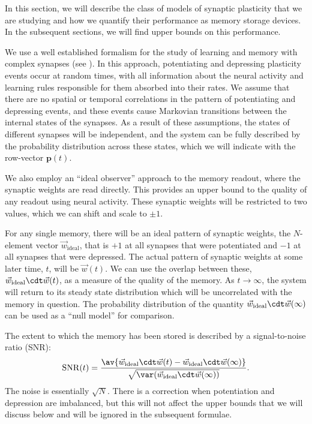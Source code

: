 \documentclass{article} %
\DeclareMathOperator{\snr}{SNR}
\newcommand{\wv}{\vec{w}}
\newcommand{\wvi}{\vec{w}_\text{ideal}}
\newcommand{\pr}{\mathbf{p}}
\begin{document}
In this section, we will describe the class of models of synaptic plasticity that we are studying and how we quantify their performance as memory storage devices.
In the subsequent sections, we will find upper bounds on this performance.

We use a well established formalism for the study of learning and memory with complex synapses (see \cite{Fusi2005cascade,Fusi2007multistate,Barrett2008discrete}).
In this approach, potentiating and depressing plasticity events occur at random times, with all information about the neural activity and learning rules responsible for them absorbed into their rates.
We assume that there are no spatial or temporal correlations in the pattern of potentiating and depressing events, and these events cause Markovian transitions between the internal states of the synapses.
As a result of these assumptions, the states of different synapses will be independent, and the system can be fully described by the probability distribution across these states, which we will indicate with the row-vector $\pr(t)$.

We also employ an ``ideal observer'' approach to the memory readout, where the synaptic weights are read directly.
This provides an upper bound to the quality of any readout using neural activity.
These synaptic weights will be restricted to two values, which we can shift and scale to $\pm1$.

For any single memory, there will be an ideal pattern of synaptic weights, the $N$-element vector $\wvi$, that is $+1$ at all synapses that were potentiated and $-1$ at all synapses that were depressed.
The actual pattern of synaptic weights at some later time, $t$, will be $\wv(t)$.
We can use the overlap between these, $\wvi\cdt\wv(t)$, as a measure of the quality of the memory.
As $t\to\infty$, the system will return to its steady state distribution which will be uncorrelated with the memory in question.
The probability distribution of the quantity $\wvi\cdt\wv(\infty)$ can be used as a ``null model'' for comparison.

The extent to which the memory has been stored is described by a signal-to-noise ratio (SNR):
%
\begin{equation}\label{eq:SNRdef}
  \snr(t) = \frac{\av{\wv_\text{ideal}\cdt\wv(t) - \wv_\text{ideal}\cdt\wv(\infty)}}
     {\sqrt{\var(\wv_\text{ideal}\cdt\wv(\infty))}}.
\end{equation}
%
The noise is essentially $\sqrt{N}$.
There is a correction when potentiation and depression are imbalanced, but this will not affect the upper bounds that we will discuss below and will be ignored in the subsequent formulae.
\end{document}
